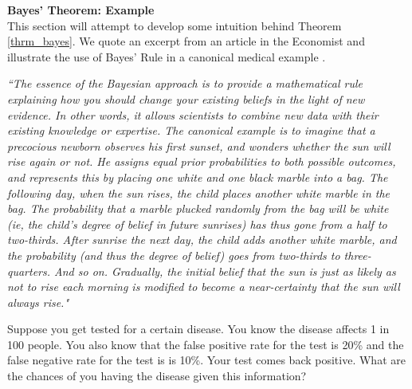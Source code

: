 \documentclass[../masters.tex]{subfiles}
\begin{document}
\textbf{Bayes' Theorem: Example}\\
This section will attempt to develop some intuition behind Theorem \ref{thrm_bayes}. We quote an excerpt from an article in the Economist \cite{eco1} and illustrate the use of Bayes' Rule in a canonical medical example \cite{korb}.

\textit{``The essence of the Bayesian approach is to provide a mathematical rule explaining how you should change your existing beliefs in the light of new evidence. In other words, it allows scientists to combine new data with their existing knowledge or expertise. The canonical example is to imagine that a precocious newborn observes his first sunset, and wonders whether the sun will rise again or not. He assigns equal prior probabilities to both possible outcomes, and represents this by placing one white and one black marble into a bag. The following day, when the sun rises, the child places another white marble in the bag. The probability that a marble plucked randomly from the bag will be white (ie, the child's degree of belief in future sunrises) has thus gone from a half to two-thirds. After sunrise the next day, the child adds another white marble, and the probability (and thus the degree of belief) goes from two-thirds to three-quarters. And so on. Gradually, the initial belief that the sun is just as likely as not to rise each morning is modified to become a near-certainty that the sun will always rise."}

Suppose you get tested for a certain disease. You know the disease affects 1 in 100 people. You also know that the false positive rate for the test is 20\% and the false negative rate for the test is is 10\%. Your test comes back positive. What are the chances of you having the disease given this information?
\end{document}
